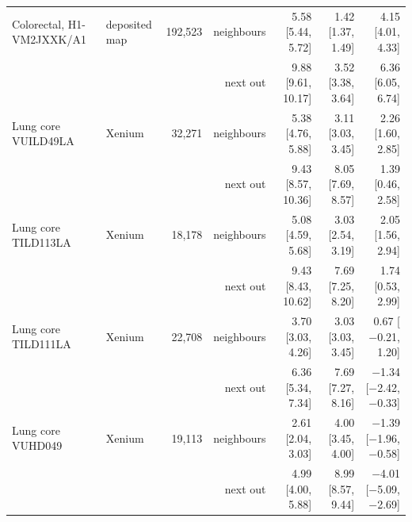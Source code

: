 {\begin{table}[H]
\begin{tabular}{llrrrrr}
\addlinespace[2pt]
Colorectal, H1-VM2JXXK/A1 & deposited map & 192,523 & neighbours & 5.58 [5.44, 5.72] & 1.42 [1.37, 1.49] & 4.15 [4.01, 4.33] \\
 &  &  & next out & 9.88 [9.61, 10.17] & 3.52 [3.38, 3.64] & 6.36 [6.05, 6.74] \\
\addlinespace[2pt]
Lung core VUILD49LA & Xenium & 32,271 & neighbours & 5.38 [4.76, 5.88] & 3.11 [3.03, 3.45] & 2.26 [1.60, 2.85] \\
 &  &  & next out & 9.43 [8.57, 10.36] & 8.05 [7.69, 8.57] & 1.39 [0.46, 2.58] \\
\addlinespace[2pt]
Lung core TILD113LA & Xenium & 18,178 & neighbours & 5.08 [4.59, 5.68] & 3.03 [2.54, 3.19] & 2.05 [1.56, 2.94] \\
 &  &  & next out & 9.43 [8.43, 10.62] & 7.69 [7.25, 8.20] & 1.74 [0.53, 2.99] \\
\addlinespace[2pt]
Lung core TILD111LA & Xenium & 22,708 & neighbours & 3.70 [3.03, 4.26] & 3.03 [3.03, 3.45] & 0.67 [$-$0.21, 1.20] \\
 &  &  & next out & 6.36 [5.34, 7.34] & 7.69 [7.27, 8.16] & $-$1.34 [$-$2.42, $-$0.33] \\
\addlinespace[2pt]
Lung core VUHD049 & Xenium & 19,113 & neighbours & 2.61 [2.04, 3.03] & 4.00 [3.45, 4.00] & $-$1.39 [$-$1.96, $-$0.58] \\
 &  &  & next out & 4.99 [4.00, 5.88] & 8.99 [8.57, 9.44] & $-$4.01 [$-$5.09, $-$2.69] \\
\bottomrule
\end{tabular}
\end{table}
}

